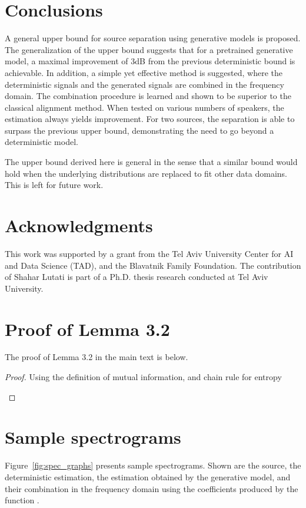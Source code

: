 \documentclass{article}
\theoremstyle{plain}
\theoremstyle{definition}
\theoremstyle{remark}
\begin{document}
\section{Conclusions}
A general upper bound for source separation using generative models is proposed.
The generalization of the upper bound suggests that for a pretrained generative model, a maximal improvement of 3dB from the previous deterministic bound is achievable.
In addition, a simple yet effective method is suggested, where the deterministic signals and the generated signals are combined in the frequency domain.
The combination procedure is learned and shown to be superior to the classical alignment method. When tested on various numbers of speakers, the estimation always yields improvement. For two sources, the separation is able to surpass the previous upper bound, demonstrating the need to go beyond a deterministic model.

The upper bound derived here is general in the sense that a similar bound would hold when the underlying distributions are replaced to fit other data domains. This is left for future work.

\section{Acknowledgments}
This work was supported by a grant from the Tel Aviv University Center for AI and Data Science
(TAD), and the Blavatnik Family Foundation. The contribution of Shahar Lutati is part of a Ph.D. thesis research
conducted at Tel Aviv University.



\newpage
\appendix
\section{Proof of Lemma 3.2}

The proof of Lemma 3.2 in the main text is below.
\begin{proof}
Using the definition of mutual information, and chain rule for entropy

\label{proof:lemma}
\end{proof}

\section{Sample spectrograms}
\label{app:spec_graphs}

Figure~\ref{fig:spec_graphs} presents sample spectrograms. Shown are the source, the deterministic estimation, the estimation obtained by the generative model, and their combination in the frequency domain using the coefficients produced by the function .
\end{document}
